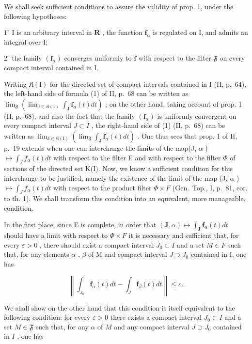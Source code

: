 We shall seek sufficient conditions to assure the validity of prop. 1, under the following hypotheses:

\(1^{\circ}\) I is an arbitrary interval in \(\mathbf{R}\) , the function \(\mathbf{f}_{\alpha}\) is regulated on I, and admits an integral over I;

\(2^{\circ}\) the family \((\mathbf{f}_{\alpha})\) converges uniformly to \(\mathbf{f}\) with respect to the filter \(\mathfrak{F}\) on every compact interval contained in I.

Writing \(\mathfrak{K}(\mathrm{I})\) for the directed set of compact intervals contained in I (II, p.~64), the left-hand side of formula (1) of II, p.~68 can be written as \(\lim_{\mathfrak{F}}\left(\lim_{\mathrm{J}\in \mathfrak{K}(\mathrm{I})}\int_{\mathrm{J}}\mathbf{f}_{\alpha}(t)dt\right)\) ; on
the other hand, taking account of prop. 1 (II, p.~68), and also the fact that the family \((\mathbf{f}_{\alpha})\) is uniformly convergent on every compact interval \(J \subset I\) , the right-hand side of (1) (II, p.~68) can be written as \(\lim_{\mathrm{J} \in \mathfrak{K}(\mathrm{I})} \left( \lim_{\mathfrak{F}} \int_{\mathrm{J}} \mathbf{f}_{\alpha}(t) dt \right)\) . One thus sees that prop. 1 of
II, p.~19 extends when one can interchange the limits of the map(J, \(\alpha\) ) \(\mapsto \int_{J} f_{\alpha}(t) dt\) with respect to the filter F and with respect to the filter \(\Phi\) of sections of the directed set K(I). Now, we know a sufficient condition for this interchange to be justified, namely the existence of the limit of the map (J, \(\alpha\) ) \(\mapsto \int_{J} f_{\alpha}(t) dt\) with respect to the product filter \(\Phi \times F\) (Gen.~Top., I, p.~81, cor. to th. 1). We shall transform this condition into an equivalent, more manageable, condition.

In the first place, since E is complete, in order that \((\mathbf{J}, \alpha) \mapsto \int_{\mathbf{J}} \mathbf{f}_{\alpha}(t) dt\) should have a limit with respect to \(\Phi \times F\) it is necessary and sufficient that, for every \(\varepsilon > 0\) , there should exist a compact interval \(J_{0} \subset I\) and a set \(M \in F\) such that, for any elements \(\alpha\) , \(\beta\) of M and compact interval \(J \supset J_{0}\) contained in I, one has

\[
\left\| \int_ {J _ {0}} \mathbf {f} _ {\alpha} (t) d t - \int_ {J} \mathbf {f} _ {\beta} (t) d t \right\| \leqslant \varepsilon .\tag{4}
\]

We shall show on the other hand that this condition is itself equivalent to the following condition: for every \(\varepsilon > 0\) there exists a compact interval \(J_0 \subset I\) and a set \(M \in \mathfrak{F}\) such that, for any \(\alpha\) of \(M\) and any compact interval \(J \supset J_0\) contained in \(I\) , one has

